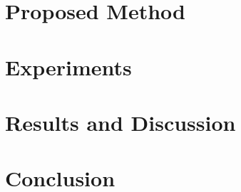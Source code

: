 \documentclass[twocolumn]{svjour3}
\begin{document}
\section{Proposed Method}\label{sec:method}

\section{Experiments}\label{sec:experiments}

\section{Results and Discussion}\label{sec:results}

\FloatBarrier
\section{Conclusion}\label{sec:conclusion}




\begingroup
\raggedright

\endgroup
\end{document}
